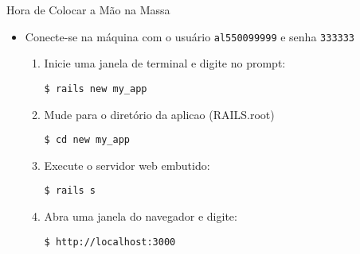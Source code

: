 \begin{frame}[fragile,t]{Hora de Colocar a Mão na Massa}
	\begin{itemize}
		\item Conecte-se na máquina com o usuário \verb|al550099999| e senha \verb|333333|
		\begin{enumerate}
	    \item Inicie uma janela de terminal e digite no prompt:
	     \begin{lstlisting}[style=BashInputBasicStyle]
	     $ rails new my_app
	     \end{lstlisting}

	    \item Mude para o diretório da aplicao (RAILS.root)
	     \begin{lstlisting}[style=BashInputBasicStyle]
	     $ cd new my_app
	     \end{lstlisting}
    
	    \item Execute o servidor web embutido:
	    \begin{lstlisting}[style=BashInputBasicStyle]
	    $ rails s
	    \end{lstlisting}
	    
	    \item Abra uma janela do navegador e digite:
	     \begin{lstlisting}[style=BashInputBasicStyle]
	     $ http://localhost:3000
	     \end{lstlisting}
	  \end{enumerate}
	\end{itemize}
  
\end{frame}